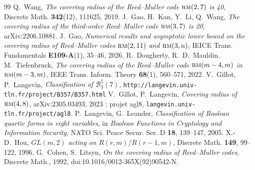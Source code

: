 \documentclass[11pt,a4paper]{article}
\def\bst(#1,#2,#3){\mathcal{B}_{#1}^{#2}(#3)}
\def\rmc(#1,#2){ \textsc {rm}(#1,#2) }
\theoremstyle{plain}
\theoremstyle{definition}
\theoremstyle{remark}
\begin{document}
\begin{thebibliography}{99}
 Q.~Wang, \emph{The covering radius of the Reed--Muller code $\rmc(2,7)$ is 40},
 Discrete Math. \textbf{342}(12), 111625, 2019.
 J.~Gao, H.~Kan, Y.~Li, Q.~Wang, \emph{The covering radius of the third-order
 Reed--Muller code $\rmc(3,7)$ is 20}, arXiv:2206.10881.
 J.~Gao, \emph{Numerical results and asymptotic lower bound on the covering
 radius of Reed--Muller codes $\rmc(2,11)$ and $\rmc(3,n)$}, IEICE Trans.
 Fundamentals \textbf{E109-A}(1), 35--46, 2026.
 R.~Dougherty, R.~D.~Mauldin, M.~Tiefenbruck, \emph{The covering radius of the
 Reed--Muller code $\rmc(m-4,m)$ in $\rmc(m-3,m)$}, IEEE Trans. Inform. Theory
 \textbf{68}(1), 560--571, 2022.
 V.~Gillot, P.~Langevin, \emph{Classification of $\bst(3,5,7)$},\newline
\texttt{http://langevin.univ-tln.fr/project/B357/B357.html}
 V.~Gillot, P.~Langevin, \emph{Covering radius of $\rmc(4,8)$},
 arXiv:2305.03493, 2023 ; projet agl8, \texttt{langevin.univ-tln.fr/project/agl8}.
 P.~Langevin, G.~Leander, \emph{Classification of Boolean quartic forms in eight
 variables}, in \emph{Boolean Functions in Cryptology and Information Security}, NATO Sci.
 Peace Secur. Ser. D \textbf{18}, 139--147, 2005.
 X.-D.~Hou, \emph{$GL(m,2)$ acting on $R(r,m)/R(r-1,m)$}, Discrete Math.
 \textbf{149}, 99--122, 1996.
 G.~Cohen, S.~Litsyn, \emph{On the covering radius of Reed--Muller codes},
 Discrete Math., 1992, doi:10.1016/0012-365X(92)90542-N.
\end{thebibliography}
\end{document}
